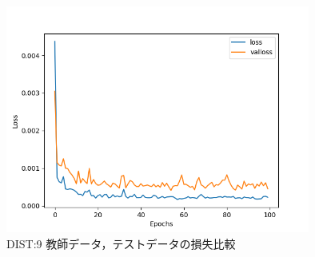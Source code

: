 \documentclass{jreport}		%
\begin{document}
\begin{figure}[htbp]
 \begin{center}
  \includegraphics[width=100mm]{gain10_loss_hikaku.png}
 \end{center}
 \caption{DIST:9 教師データ，テストデータの損失比較}
 \label{fig:one}
\end{figure}
\end{document}
